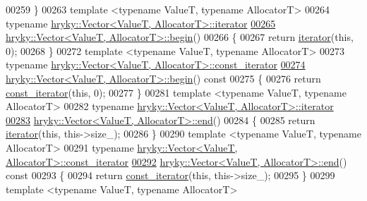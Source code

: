 \begin{DoxyCode}
00259 \}
00263 \textcolor{keyword}{template} <\textcolor{keyword}{typename} ValueT, \textcolor{keyword}{typename} AllocatorT>
00264 \textcolor{keyword}{typename} \hyperlink{classhryky_1_1iterator_1_1random_1_1_mutable}{hryky::Vector<ValueT, AllocatorT>::iterator}
\hypertarget{vector_8h_source_l00265}{}\hyperlink{classhryky_1_1_vector_aa032aa9e48dce836e68434e6ad58f0f5}{00265} \hyperlink{classhryky_1_1_vector}{hryky::Vector<ValueT, AllocatorT>::begin}()
00266 \{
00267     \textcolor{keywordflow}{return} \hyperlink{classhryky_1_1iterator_1_1random_1_1_mutable}{iterator}(\textcolor{keyword}{this}, 0);
00268 \}
00272 \textcolor{keyword}{template} <\textcolor{keyword}{typename} ValueT, \textcolor{keyword}{typename} AllocatorT>
00273 \textcolor{keyword}{typename} \hyperlink{classhryky_1_1iterator_1_1random_1_1_immutable}{hryky::Vector<ValueT, AllocatorT>::const_iterator}
\hypertarget{vector_8h_source_l00274}{}\hyperlink{classhryky_1_1_vector_a244f7b781e42a20b70c04611b19db164}{00274} \hyperlink{classhryky_1_1_vector}{hryky::Vector<ValueT, AllocatorT>::begin}()\textcolor{keyword}{ const}
00275 \textcolor{keyword}{}\{
00276     \textcolor{keywordflow}{return} \hyperlink{classhryky_1_1iterator_1_1random_1_1_immutable}{const_iterator}(\textcolor{keyword}{this}, 0);
00277 \}
00281 \textcolor{keyword}{template} <\textcolor{keyword}{typename} ValueT, \textcolor{keyword}{typename} AllocatorT>
00282 \textcolor{keyword}{typename} \hyperlink{classhryky_1_1iterator_1_1random_1_1_mutable}{hryky::Vector<ValueT, AllocatorT>::iterator}
\hypertarget{vector_8h_source_l00283}{}\hyperlink{classhryky_1_1_vector_ae17851e0d811d052645dd6e5a507f365}{00283} \hyperlink{classhryky_1_1_vector}{hryky::Vector<ValueT, AllocatorT>::end}()
00284 \{
00285     \textcolor{keywordflow}{return} \hyperlink{classhryky_1_1iterator_1_1random_1_1_mutable}{iterator}(\textcolor{keyword}{this}, this->size\_);
00286 \}
00290 \textcolor{keyword}{template} <\textcolor{keyword}{typename} ValueT, \textcolor{keyword}{typename} AllocatorT>
00291 \textcolor{keyword}{typename} \hyperlink{classhryky_1_1iterator_1_1random_1_1_immutable}{hryky::Vector<ValueT, AllocatorT>::const_iterator}
\hypertarget{vector_8h_source_l00292}{}\hyperlink{classhryky_1_1_vector_acd3e720b6a359bb00873e0de3d6229d6}{00292} \hyperlink{classhryky_1_1_vector}{hryky::Vector<ValueT, AllocatorT>::end}()\textcolor{keyword}{ const}
00293 \textcolor{keyword}{}\{
00294     \textcolor{keywordflow}{return} \hyperlink{classhryky_1_1iterator_1_1random_1_1_immutable}{const_iterator}(\textcolor{keyword}{this}, this->size\_);
00295 \}
00299 \textcolor{keyword}{template} <\textcolor{keyword}{typename} ValueT, \textcolor{keyword}{typename} AllocatorT>

\end{DoxyCode}
